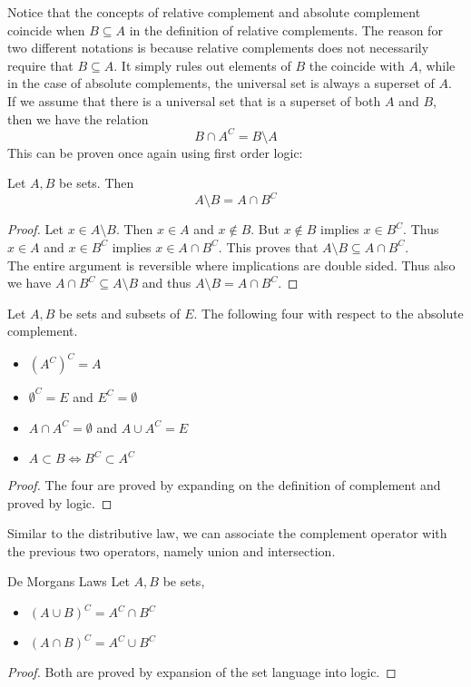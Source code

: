 \documentclass[a4paper]{article}
\begin{document}
Notice that the concepts of relative complement and absolute complement coincide when $B\subseteq A$ in the definition of relative complements. The reason for two different notations is because relative complements does not necessarily require that $B\subseteq A$. It simply rules out elements of $B$ the coincide with $A$, while in the case of absolute complements, the universal set is always a superset of $A$. \\

If we assume that there is a universal set that is a superset of both $A$ and $B$, then we have the relation $$B\cap A^C=B\setminus A$$ This can be proven once again using first order logic:

\begin{prp}{}{} Let $A,B$ be sets. Then $$A\setminus B=A\cap B^C$$
\begin{proof} Let $x\in A\setminus B$. Then $x\in A$ and $x\notin B$. But $x\notin B$ implies $x\in B^C$. Thus $x\in A$ and $x\in B^C$ implies $x\in A\cap B^C$. This proves that $A\setminus B\subseteq A\cap B^C$. \\
The entire argument is reversible where implications are double sided. Thus also we have $A\cap B^C\subseteq A\setminus B$ and thus $A\setminus B=A\cap B^C$. 
\end{proof}
\end{prp}

\begin{prp}{}{} Let $A,B$ be sets and subsets of $E$. The following four with respect to the absolute complement. 
\begin{itemize}
\item $(A^C)^C=A$
\item $\emptyset^C=E$ and $E^C=\emptyset$
\item $A\cap A^C=\emptyset$ and $A\cup A^C=E$
\item $A\subset B\iff B^C\subset A^C$
\end{itemize}
\begin{proof} The four are proved by expanding on the definition of complement and proved by logic. 
\end{proof}
\end{prp}

Similar to the distributive law, we can associate the complement operator with the previous two operators, namely union and intersection. 

\begin{thm}{De Morgans Laws}{} Let $A,B$ be sets, 
\begin{itemize}
\item $(A\cup B)^C=A^C\cap B^C$
\item $(A\cap B)^C=A^C\cup B^C$
\end{itemize}
\begin{proof} Both are proved by expansion of the set language into logic. 
\end{proof}
\end{thm}
\end{document}
